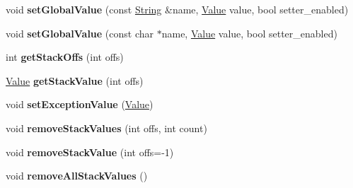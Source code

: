 \begin{DoxyCompactItemize}
\item 
void {\bfseries set\+Global\+Value} (const \hyperlink{class_object_script_1_1_o_s_1_1_core_1_1_string}{String} \&name, \hyperlink{struct_object_script_1_1_o_s_1_1_core_1_1_value}{Value} value, bool setter\+\_\+enabled)\hypertarget{class_object_script_1_1_o_s_1_1_core_a90d399756b9b68a7b7a8c6daea99f91b}{}\label{class_object_script_1_1_o_s_1_1_core_a90d399756b9b68a7b7a8c6daea99f91b}

\item 
void {\bfseries set\+Global\+Value} (const char $\ast$name, \hyperlink{struct_object_script_1_1_o_s_1_1_core_1_1_value}{Value} value, bool setter\+\_\+enabled)\hypertarget{class_object_script_1_1_o_s_1_1_core_a5d15feff140f57934e58eca9c850b979}{}\label{class_object_script_1_1_o_s_1_1_core_a5d15feff140f57934e58eca9c850b979}

\item 
int {\bfseries get\+Stack\+Offs} (int offs)\hypertarget{class_object_script_1_1_o_s_1_1_core_a2e42d97983571e991923b9a526562d14}{}\label{class_object_script_1_1_o_s_1_1_core_a2e42d97983571e991923b9a526562d14}

\item 
\hyperlink{struct_object_script_1_1_o_s_1_1_core_1_1_value}{Value} {\bfseries get\+Stack\+Value} (int offs)\hypertarget{class_object_script_1_1_o_s_1_1_core_a606857eed7d5a78da28600c368a3fb63}{}\label{class_object_script_1_1_o_s_1_1_core_a606857eed7d5a78da28600c368a3fb63}

\item 
void {\bfseries set\+Exception\+Value} (\hyperlink{struct_object_script_1_1_o_s_1_1_core_1_1_value}{Value})\hypertarget{class_object_script_1_1_o_s_1_1_core_a01aeb85ebccf9ce8180bca6d2bca1f0d}{}\label{class_object_script_1_1_o_s_1_1_core_a01aeb85ebccf9ce8180bca6d2bca1f0d}

\item 
void {\bfseries remove\+Stack\+Values} (int offs, int count)\hypertarget{class_object_script_1_1_o_s_1_1_core_a66f8b3f8b78c408261fd58492e1023d5}{}\label{class_object_script_1_1_o_s_1_1_core_a66f8b3f8b78c408261fd58492e1023d5}

\item 
void {\bfseries remove\+Stack\+Value} (int offs=-\/1)\hypertarget{class_object_script_1_1_o_s_1_1_core_a081d636285e6c4d5925237a3493e7001}{}\label{class_object_script_1_1_o_s_1_1_core_a081d636285e6c4d5925237a3493e7001}

\item 
void {\bfseries remove\+All\+Stack\+Values} ()\hypertarget{class_object_script_1_1_o_s_1_1_core_a1c8545d9be6825d2efda828a54e454b6}{}\label{class_object_script_1_1_o_s_1_1_core_a1c8545d9be6825d2efda828a54e454b6}


\end{DoxyCompactItemize}
